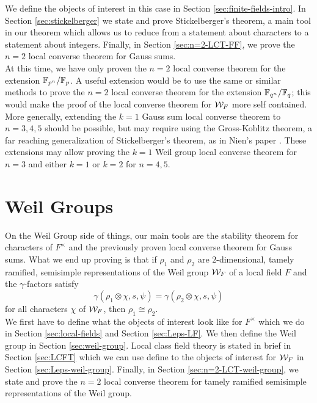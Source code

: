 We define the objects of interest in this case in Section \ref{sec:finite-fields-intro}.
In Section \ref{sec:stickelberger} we state and prove Stickelberger's theorem, a main tool in our theorem which allows us to reduce from a statement about characters to a statement about integers.
Finally, in Section \ref{sec:n=2-LCT-FF}, we prove the $n=2$ local converse theorem for Gauss sums.
\\

At this time, we have only proven the $n=2$ local converse theorem for the extension $\mathbb{F}_{p^n}/\mathbb{F}_{p}$.
A useful extension would be to use the same or similar methods to prove the $n=2$ local converse theorem for the extension $\mathbb{F}_{q^n}/\mathbb{F}_q$; this would make the proof of the local converse theorem for $\mathcal{W}_F$ more self contained.
More generally, extending the $k = 1$ Gauss sum local converse theorem to $n = 3,4,5$ should be possible, but may require using the Gross-Koblitz theorem, a far reaching generalization of Stickelberger's theorem, as in Nien's paper \cite{Nien2018}.
These extensions may allow proving the $k = 1$ Weil group local converse theorem for $n = 3$ and either $k = 1$ or $k =2 $ for $n = 4,5$.
\\

\section{Weil Groups}
On the Weil Group side of things, our main tools are the stability theorem for characters of $F^\times$ and the previously proven local converse theorem for Gauss sums.
What we end up proving is that if $\rho_1$ and $\rho_2$ are $2$-dimensional, tamely ramified, semisimple representations of the Weil group $\mathcal{W}_F$ of a local field $F$ and the $\gamma$-factors satisfy
\[\gamma(\rho_1 \otimes \chi, s, \psi) = \gamma(\rho_2 \otimes \chi, s, \psi)\]
for all characters $\chi$ of $\mathcal{W}_F$, then $\rho_1 \cong \rho_2$.
\\

We first have to define what the objects of interest look like for $F^\times$ which we do in Section \ref{sec:local-fields} and Section \ref{sec:Leps-LF}.
We then define the Weil group in Section \ref{sec:weil-group}.
Local class field theory is stated in brief in Section \ref{sec:LCFT} which we can use define to the objects of interest for $\mathcal{W}_F$ in Section \ref{sec:Leps-weil-group}.
Finally, in Section \ref{sec:n=2-LCT-weil-group}, we state and prove the $n=2$ local converse theorem for tamely ramified semisimple representations of the Weil group.
\\

